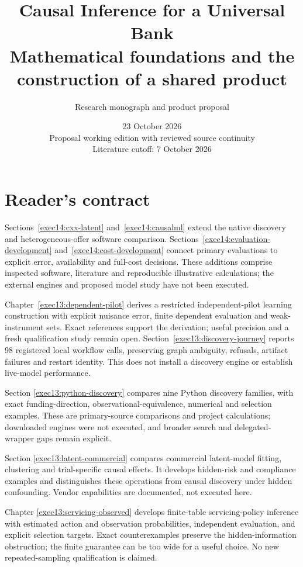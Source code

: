 \documentclass[11pt,a4paper,openany]{book}
\title{\sffamily\bfseries\color{ink}Causal Inference for a Universal Bank\\[14pt]
\Large Mathematical foundations and the construction of a shared product}
\author{Research monograph and product proposal}
\date{23 October 2026\\Proposal working edition with reviewed source continuity\\Literature cutoff: 7 October 2026}
\begin{document}
\frontmatter
\maketitle
\chapter*{Reader's contract}

Sections~\ref{exec14:cxx-latent} and~\ref{exec14:causalml} extend the native discovery and heterogeneous-offer software comparison. Sections~\ref{exec14:evaluation-development} and~\ref{exec14:cost-development} connect primary evaluations to explicit error, availability and full-cost decisions. These additions comprise inspected software, literature and reproducible illustrative calculations; the external engines and proposed model study have not been executed.


Chapter~\ref{exec13:dependent-pilot} derives a restricted independent-pilot
learning construction with explicit nuisance error, finite dependent evaluation
and weak-instrument sets. Exact references support the derivation; useful
precision and a fresh qualification study remain open.
Section~\ref{exec13:discovery-journey} reports 98 registered local workflow
calls, preserving graph ambiguity, refusals, artifact failures and restart
identity. This does not install a discovery engine or establish live-model performance.


Section \ref{exec13:python-discovery} compares nine Python discovery families,
with exact funding-direction, observational-equivalence, numerical and selection examples.
These are primary-source comparisons and project calculations; downloaded engines
were not executed, and broader search and delegated-wrapper gaps remain explicit.


Section \ref{exec13:latent-commercial} compares commercial latent-model fitting,
clustering and trial-specific causal effects. It develops hidden-risk and
compliance examples and distinguishes these operations from causal discovery
under hidden confounding. Vendor capabilities are documented, not executed here.


Chapter \ref{exec13:servicing-observed} develops finite-table servicing-policy
inference with estimated action and observation probabilities, independent
evaluation, and explicit selection targets. Exact counterexamples preserve
the hidden-information obstruction; the finite guarantee can be too wide
for a useful choice. No new repeated-sampling qualification is claimed.
\end{document}
